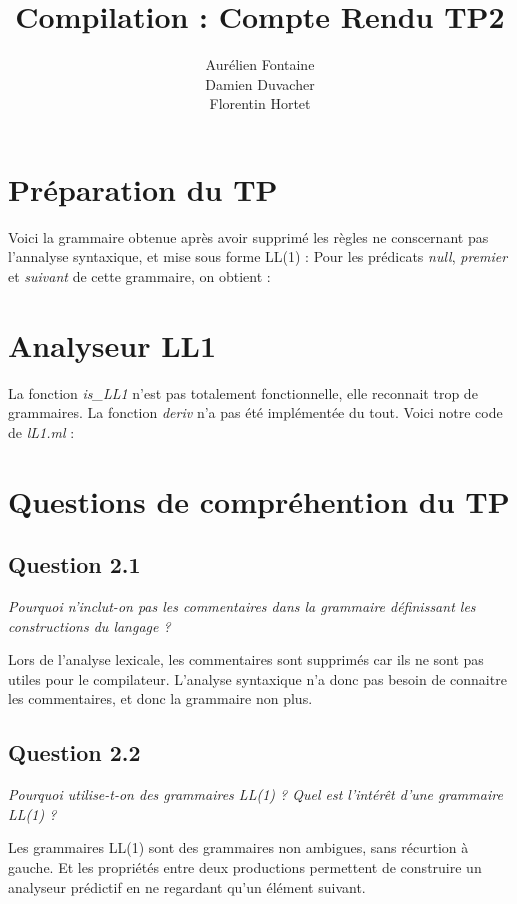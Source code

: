 \documentclass{rapport}
\author{Aurélien Fontaine \\ Damien Duvacher \\ Florentin Hortet}
\title{Compilation : Compte Rendu TP2}
\begin{document}
  \maketitle

  \chapter{Préparation du TP}
  \label{chap:PrepTP}
  Voici la grammaire obtenue après avoir supprimé les règles ne conscernant
  pas l'annalyse syntaxique, et mise sous forme LL(1) :
  Pour les prédicats \textit{null}, \textit{premier} et \textit{suivant}
  de cette grammaire, on obtient :

  \chapter{Analyseur LL1}
  \label{chap:AnalyseurLL1}
  La fonction \textit{is\_LL1} n'est pas totalement fonctionnelle,
  elle reconnait trop de grammaires.
  La fonction \textit{deriv} n'a pas été implémentée du tout.
  Voici notre code de \textit{lL1.ml} :

  \chapter{Questions de compréhention du TP}
  \label{chap:QuestionsTP}
  \section{Question 2.1}
  \textit{Pourquoi n'inclut-on pas les commentaires dans la grammaire
  définissant les constructions du langage ?}

  Lors de l'analyse lexicale, les commentaires sont supprimés car ils
  ne sont pas utiles pour le compilateur. L'analyse syntaxique n'a donc pas
  besoin de connaitre les commentaires, et donc la grammaire non plus.

  \section{Question 2.2}
  \textit{Pourquoi utilise-t-on des grammaires \emph{LL(1)} ? Quel est
  l'intérêt d'une grammaire \emph{LL(1)} ?}

  Les grammaires LL(1) sont des grammaires non ambigues, sans récurtion à
  gauche. Et les propriétés entre deux productions permettent de construire
  un analyseur prédictif en ne regardant qu'un élément suivant.
\end{document}
